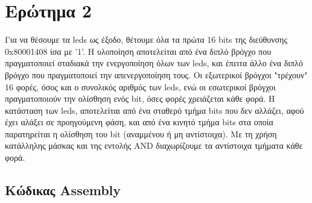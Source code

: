\documentclass[a4paper]{article}
\begin{document}
\section*{Ερώτημα 2}
\par
Για να θέσουμε τα leds ως έξοδο, θέτουμε όλα τα πρώτα 16 bits της διεύθυνσης 0x80001408 ίσα με '1'. Η υλοποίηση αποτελείται από ένα διπλό βρόγχο 
που πραγματοποιεί σταδιακά την ενεργοποίηση όλων των leds, και έπειτα άλλο ένα διπλό βρόγχο που πραγματοποιεί την απενεργοποίηση τους. Οι εξωτερικοί βρόγχοι "τρέχουν" 
16 φορές, όσος και ο συνολικός αριθμός των leds, ενώ οι εσωτερικοί βρόγχοι πραγματοποιούν την ολίσθηση ενός bit, όσες φορές χρειάζεται κάθε φορά. Η κατάσταση των leds, αποτελείται από 
ένα σταθερό τμήμα bits που δεν αλλάζει, αφού έχει αλάξει σε προηγούμενη φάση, και από ένα κινητό τμήμα bits στα οποία παρατηρείται η ολίσθηση του bit (αναμμένου ή μη αντίστοιχα). 
Με τη χρήση κατάλληλης μάσκας και της εντολής AND διαχωρίζουμε τα αντίστοιχα τμήματα κάθε φορά.
\par


\subsection*{Κώδικας Assembly}
\end{document}
